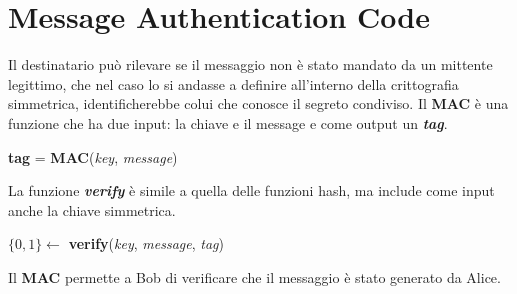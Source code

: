 \section{Message Authentication Code}

\begin{flushleft}
    Il destinatario può rilevare se il messaggio non è stato mandato da un mittente legittimo, che nel caso lo si andasse a definire all'interno della crittografia simmetrica, identificherebbe colui che conosce il segreto condiviso. Il \textbf{MAC} è una funzione che ha due input: la chiave e il message e come output un \textbf{\textit{tag}}.

    {\centering
        \textbf{tag} = \textbf{MAC}(\textit{key}, \textit{message})
    \par}

    La funzione \textbf{\textit{verify}} è simile a quella delle funzioni hash, ma include come input anche la chiave simmetrica.

    {\centering
        $\{0, 1\} \leftarrow$ \textbf{verify}(\textit{key}, \textit{message}, \textit{tag})
    \par}

    Il \textbf{MAC} permette a Bob di verificare che il messaggio è stato generato da Alice.
\end{flushleft}

